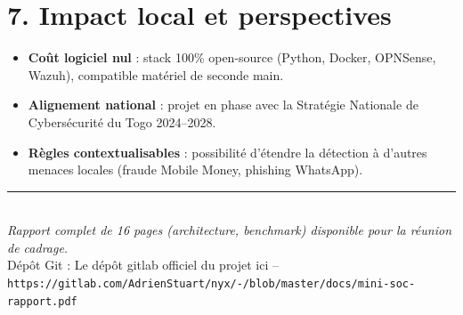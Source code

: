 \documentclass[12pt,a4paper]{article}
\begin{document}
\section*{\textcolor{mainblue}{7. Impact local et perspectives}}
\begin{itemize}[leftmargin=*, itemsep=0.15cm]
    \item \textbf{Coût logiciel nul} : stack 100\% open-source (Python, Docker, OPNSense, Wazuh), compatible matériel de seconde main.
    \item \textbf{Alignement national} : projet en phase avec la Stratégie Nationale de Cybersécurité du Togo 2024--2028.
    \item \textbf{Règles contextualisables} : possibilité d'étendre la détection à d'autres menaces locales (fraude Mobile Money, phishing WhatsApp).
\end{itemize}

\vfill
\begin{center}
\textcolor{gray}{\rule{0.8\textwidth}{0.5pt}} \\[0.2cm]
\footnotesize\textit{Rapport complet de 16 pages (architecture, benchmark) disponible pour la réunion de cadrage.} \\
\footnotesize Dépôt Git : Le dépôt gitlab officiel du projet ici -- \texttt{https://gitlab.com/AdrienStuart/nyx/-/blob/master/docs/mini-soc-rapport.pdf} 
\end{center}
\end{document}
